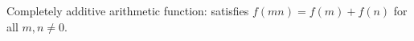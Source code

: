 \begin{definition}[IsCompletelyAdditive]
\label{IsCompletelyAdditive}
\leanok
Completely additive arithmetic function: satisfies $f(mn) = f(m) + f(n)$ for all $m, n \ne 0$.
\end{definition}
